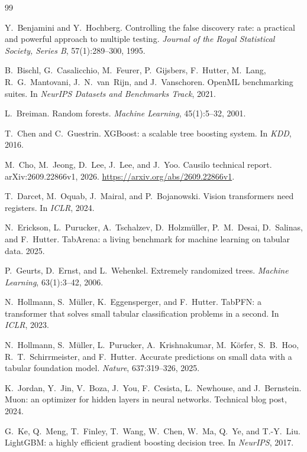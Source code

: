 \documentclass[11pt]{article}
\begin{document}
\begin{thebibliography}{99}\small

 Y.~Benjamini and Y.~Hochberg. Controlling the false discovery rate: a
practical and powerful approach to multiple testing. \emph{Journal of the Royal Statistical Society,
Series B}, 57(1):289--300, 1995.

 B.~Bischl, G.~Casalicchio, M.~Feurer, P.~Gijsbers, F.~Hutter, M.~Lang,
R.~G.~Mantovani, J.~N.~van~Rijn, and J.~Vanschoren. OpenML benchmarking suites. In \emph{NeurIPS
Datasets and Benchmarks Track}, 2021.

 L.~Breiman. Random forests. \emph{Machine Learning}, 45(1):5--32, 2001.

 T.~Chen and C.~Guestrin. XGBoost: a scalable tree boosting system. In
\emph{KDD}, 2016.

 M.~Cho, M.~Jeong, D.~Lee, J.~Lee, and J.~Yoo. Causilo technical report.
arXiv:2609.22866v1, 2026. \url{https://arxiv.org/abs/2609.22866v1}.

 T.~Darcet, M.~Oquab, J.~Mairal, and P.~Bojanowski. Vision transformers need
registers. In \emph{ICLR}, 2024.

 N.~Erickson, L.~Purucker, A.~Tschalzev, D.~Holzm\"uller, P.~M.~Desai,
D.~Salinas, and F.~Hutter. TabArena: a living benchmark for machine learning on tabular data. 2025.

 P.~Geurts, D.~Ernst, and L.~Wehenkel. Extremely randomized trees. \emph{Machine
Learning}, 63(1):3--42, 2006.

 N.~Hollmann, S.~M\"uller, K.~Eggensperger, and F.~Hutter. TabPFN: a
transformer that solves small tabular classification problems in a second. In \emph{ICLR}, 2023.

 N.~Hollmann, S.~M\"uller, L.~Purucker, A.~Krishnakumar, M.~K\"orfer,
S.~B.~Hoo, R.~T.~Schirrmeister, and F.~Hutter. Accurate predictions on small data with a tabular
foundation model. \emph{Nature}, 637:319--326, 2025.

 K.~Jordan, Y.~Jin, V.~Boza, J.~You, F.~Cesista, L.~Newhouse, and J.~Bernstein.
Muon: an optimizer for hidden layers in neural networks. Technical blog post, 2024.

 G.~Ke, Q.~Meng, T.~Finley, T.~Wang, W.~Chen, W.~Ma, Q.~Ye, and T.-Y.~Liu. LightGBM:
a highly efficient gradient boosting decision tree. In \emph{NeurIPS}, 2017.


\end{thebibliography}
\end{document}
